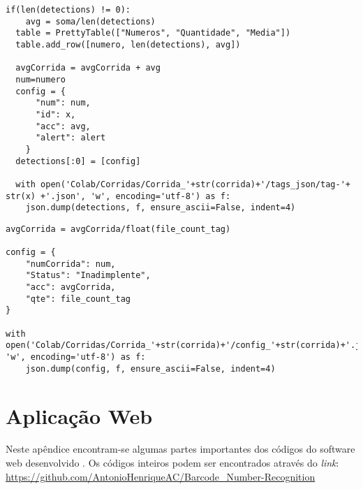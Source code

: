 \begin{lstlisting}[caption=Identificando os números nas imagens com \textit{barcodes} individuais]
  if(len(detections) != 0):
    avg = soma/len(detections)
  table = PrettyTable(["Numeros", "Quantidade", "Media"])
  table.add_row([numero, len(detections), avg])
  
  avgCorrida = avgCorrida + avg
  num=numero
  config = {
      "num": num,
      "id": x,
      "acc": avg,
      "alert": alert
    }
  detections[:0] = [config]

  with open('Colab/Corridas/Corrida_'+str(corrida)+'/tags_json/tag-'+ str(x) +'.json', 'w', encoding='utf-8') as f:
    json.dump(detections, f, ensure_ascii=False, indent=4)
\end{lstlisting}


\newpage

\begin{lstlisting}[caption=Criando o arquivo config-x.json]
avgCorrida = avgCorrida/float(file_count_tag)

config = {
    "numCorrida": num,
    "Status": "Inadimplente",
    "acc": avgCorrida,
    "qte": file_count_tag
}

with open('Colab/Corridas/Corrida_'+str(corrida)+'/config_'+str(corrida)+'.json', 'w', encoding='utf-8') as f:
    json.dump(config, f, ensure_ascii=False, indent=4)
\end{lstlisting}


\newpage

\chapter{Aplicação Web} \label{ap:web}

Neste apêndice encontram-se algumas partes importantes dos códigos do software web desenvolvido . Os códigos inteiros podem ser encontrados através do \textit{link}: \url{https://github.com/AntonioHenriqueAC/Barcode_Number-Recognition}
\newline



